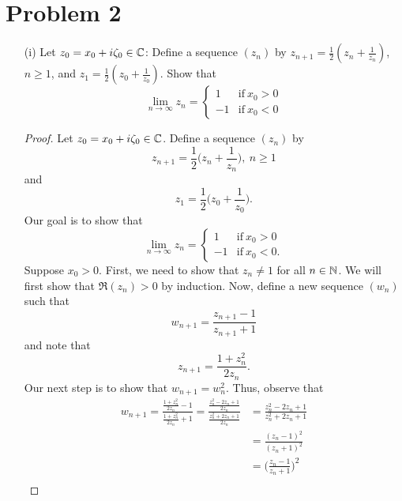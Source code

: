 \documentclass[a4paper]{article}
\begin{document}
\section*{Problem 2}
\begin{enumerate}
    \item[(i)] Let \( {z}_{0} = {x}_{0} + i {\zeta}_{0} \in \mathbb{C}  \): Define a sequence \( ({z}_{n}) \) by \( {z}_{n+1} = \frac{ 1 }{ 2 }  ({z}_{n} + \frac{ 1 }{ {z}_{n} } ) \), \( n \geq 1  \), and \( {z}_{1} = \frac{ 1 }{ 2 }  ({z}_{0} + \frac{ 1 }{ {z}_{0} } ) \). 
        Show that 
        \[  \lim_{ n  \to \infty  } {z}_{n} = 
        \begin{cases}
            1 &\text{if} \ {x}_{0} > 0 \\
            -1 &\text{if}  \ {x}_{0} < 0 
        \end{cases}   \]
    \begin{proof}
     Let \( {z}_{0} = {x}_{0} + i {\zeta}_{0} \in \mathbb{C}  \). Define a sequence \( ({z}_{n}) \) by     
     \[  {z}_{n+1} = \frac{ 1 }{ 2 }  \Big(  {z}_{n} + \frac{ 1 }{ {z}_{n} }  \Big), \ n \geq 1  \]
     and
     \[  {z}_{1} = \frac{ 1 }{ 2 } \Big(  {z}_{0} + \frac{ 1 }{ {z}_{0} }  \Big). \]
     Our goal is to show that 
        \[  \lim_{ n  \to \infty  } {z}_{n} = 
        \begin{cases}
            1 &\text{if} \ {x}_{0} > 0 \\
            -1 &\text{if}  \ {x}_{0} < 0. 
        \end{cases}   \]
        Suppose \( {x}_{0} > 0  \). First, we need to show that \( {z}_{n} \neq 1  \) for all \( n \in \mathbb{N}  \). We will first show that \( \Re({z}_{n}) > 0  \) by induction. Now, define a new sequence \( ({w}_{n})  \) such that
\[  {w}_{n+1} = \frac{ {z}_{n+1} - 1  }{  {z}_{n+1} + 1  }   \]
        and note that 
        \[  {z}_{n+1} = \frac{ 1 + {z}_{n}^{2} }{  2 {z}_{n} }.  \]
        Our next step is to show that \( {w}_{n+1} = {w}_{n}^{2} \). Thus, observe that
        \begin{align*}
            {w}_{n+1} = \frac{ \frac{ 1 + {z}_{n}^{2} }{ 2 {z}_{n} }  - 1  }{ \frac{ 1 + {z}_{n}^{2} }{ 2 {z}_{n}} + 1   }  
                      = \frac{ \frac{ {z}_{n}^{2} - 2 {z}_{n} + 1}{2 {z}_{n}}  }{ \frac{ {z}_{n}^{2} + 2 {z}_{n} + 1  }{ 2 {z}_{n} }  }  
                      &= \frac{ {z}_{n}^{2} - 2 {z}_{n} + 1  }{  {z}_{n}^{2} + 2 {z}_{n} + 1  } \\
                      &= \frac{ ({z}_{n} - 1)^{2} }{ ({z}_{n} + 1)^{2} }  \\
                      &= \Big(  \frac{ {z}_{n} -1  }{ {z}_{n} + 1  }  \Big)^{2} \\

\end{align*}
\end{proof}
\end{enumerate}
\end{document}
